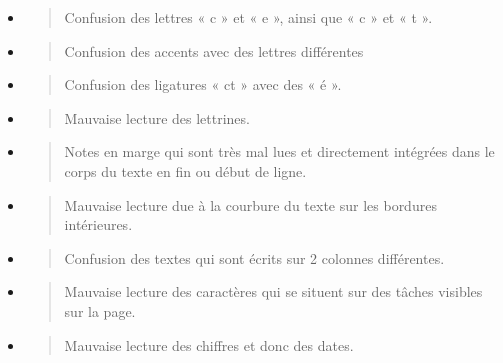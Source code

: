 \documentclass[a4paper,12pt,twoside]{book}
\begin{document}
\begin{itemize}
	\item
	\begin{quote}
		Confusion des lettres « c » et « e », ainsi que « c » et « t ».
	\end{quote}
	\item
	\begin{quote}
		Confusion des accents avec des lettres différentes
	\end{quote}
	\item
	\begin{quote}
		Confusion des ligatures « ct » avec des « é ».
	\end{quote}
	\item
	\begin{quote}
		Mauvaise lecture des lettrines.
	\end{quote}
	\item
	\begin{quote}
		Notes en marge qui sont très mal lues et directement intégrées dans le
		corps du texte en fin ou début de ligne.
	\end{quote}
	\item
	\begin{quote}
		Mauvaise lecture due à la courbure du texte sur les bordures
		intérieures.
	\end{quote}
	\item
	\begin{quote}
		Confusion des textes qui sont écrits sur 2 colonnes différentes.
	\end{quote}
	\item
	\begin{quote}
		Mauvaise lecture des caractères qui se situent sur des tâches visibles
		sur la page.
	\end{quote}
	\item
	\begin{quote}
		Mauvaise lecture des chiffres et donc des dates. \\
	\end{quote}
\end{itemize}
\end{document}
